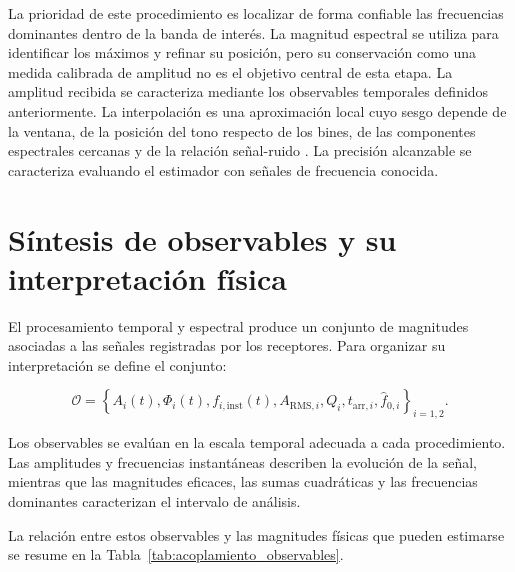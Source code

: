 La prioridad de este procedimiento es localizar de forma confiable
las frecuencias dominantes dentro de la banda de interés. La magnitud
espectral se utiliza para identificar los máximos y refinar su posición,
pero su conservación como una medida calibrada de amplitud no es el
objetivo central de esta etapa. La amplitud recibida se caracteriza
mediante los observables temporales definidos anteriormente. La
interpolación es una aproximación local cuyo sesgo depende de la
ventana, de la posición del tono respecto de los bines, de las
componentes espectrales cercanas y de la relación señal-ruido
\cite{grandke1983interpolation,jacobsen2007fast}. La precisión
alcanzable se caracteriza evaluando el estimador con señales de
frecuencia conocida.

\section{Síntesis de observables y su interpretación física}

El procesamiento temporal y espectral produce un conjunto de magnitudes
asociadas a las señales registradas por los receptores. Para organizar
su interpretación se define el conjunto:

\begin{equation}
    \mathcal{O}
    =
    \left\{
        A_i(t),
        \Phi_i(t),
        f_{i,\mathrm{inst}}(t),
        A_{\mathrm{RMS},i},
        Q_i,
        t_{\mathrm{arr},i},
        \widehat{f}_{0,i}
    \right\}_{i=1,2}.
    \label{eq:vector_observables}
\end{equation}

Los observables se evalúan en la escala temporal adecuada a cada
procedimiento. Las amplitudes y frecuencias instantáneas describen
la evolución de la señal, mientras que las magnitudes eficaces, las
sumas cuadráticas y las frecuencias dominantes caracterizan el
intervalo de análisis.

La relación entre estos observables y las magnitudes físicas que pueden
estimarse se resume en la Tabla~\ref{tab:acoplamiento_observables}.

